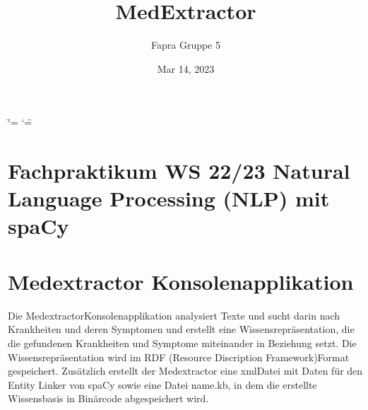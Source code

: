 \documentclass[letterpaper,10pt,english]{sphinxmanual}
\title{MedExtractor}
\date{Mar 14, 2023}
\author{Fapra Gruppe 5}
\begin{document}
\ifdefined\shorthandoff
  \ifnum\catcode`\=\string=\active\shorthandoff{=}\fi
  \ifnum\catcode`\"=\active{}\fi
\fi

\pagestyle{empty}
\sphinxmaketitle
\pagestyle{plain}
\sphinxtableofcontents
\pagestyle{normal}
\label{\detokenize{index::doc}}

\sphinxstepscope


\chapter{Fachpraktikum WS 22/23 \sphinxhyphen{} Natural Language Processing (NLP) mit spaCy}
\label{\detokenize{readme:fachpraktikum-ws-22-23-natural-language-processing-nlp-mit-spacy}}\label{\detokenize{readme::doc}}

\chapter{Medextractor \sphinxhyphen{} Konsolenapplikation}
\label{\detokenize{readme:medextractor-konsolenapplikation}}
\sphinxAtStartPar
Die Medextractor\sphinxhyphen{}Konsolenapplikation analysiert Texte und sucht darin
nach Krankheiten und deren Symptomen und erstellt eine
Wissensrepräsentation, die die gefundenen Krankheiten und Symptome
miteinander in Beziehung setzt. Die Wissensrepräsentation wird im RDF
(Resource Discription Framework)\sphinxhyphen{}Format gespeichert. Zusätzlich erstellt
der Medextractor eine xml\sphinxhyphen{}Datei mit Daten für den Entity Linker von
spaCy sowie eine Datei name.kb, in dem die erstellte Wissensbasis in
Binärcode abgespeichert wird.
\end{document}

